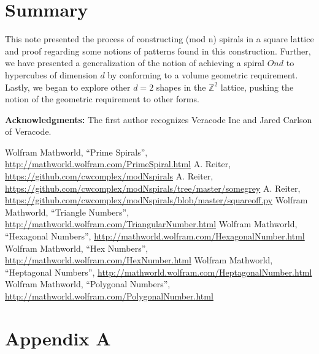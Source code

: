 \documentclass[11pt,reqno]{amsart}
\theoremstyle{mydef}
\begin{document}
\section{Summary}
This note presented the process of constructing (mod n) spirals in a square lattice and proof regarding some 
notions of patterns found in this construction. Further, we have presented a generalization of the notion of
achieving a spiral $Ond$ to hypercubes of dimension $d$ by conforming to a volume geometric requirement.
Lastly, we began to explore other $d = 2$ shapes in the $\mathbb{Z}^2$ lattice, pushing the notion of the 
geometric requirement to other forms. 

\vspace{12pt}\noindent\textbf{Acknowledgments:}\quad
The first author recognizes Veracode Inc and Jared Carlson of Veracode.

\begin{thebibliography}{1}
 Wolfram Mathworld, ``Prime Spirals'',
  \url{http://mathworld.wolfram.com/PrimeSpiral.html}
 A. Reiter,
  \url{https://github.com/cwcomplex/modNspirals}
 A. Reiter,
  \url{https://github.com/cwcomplex/modNspirals/tree/master/somegrey}
 A. Reiter,
  \url{https://github.com/cwcomplex/modNspirals/blob/master/squareoff.py}
 Wolfram Mathworld, ``Triangle Numbers'',
  \url{http://mathworld.wolfram.com/TriangularNumber.html}
 Wolfram Mathworld, ``Hexagonal Numbers'',
  \url{http://mathworld.wolfram.com/HexagonalNumber.html}
 Wolfram Mathworld, ``Hex Numbers'',
  \url{http://mathworld.wolfram.com/HexNumber.html}
 Wolfram Mathworld, ``Heptagonal Numbers'',
  \url{http://mathworld.wolfram.com/HeptagonalNumber.html}
 Wolfram Mathworld, ``Polygonal Numbers'',
  \url{http://mathworld.wolfram.com/PolygonalNumber.html}
\end{thebibliography}



\clearpage
\section{Appendix A}
\end{document}
